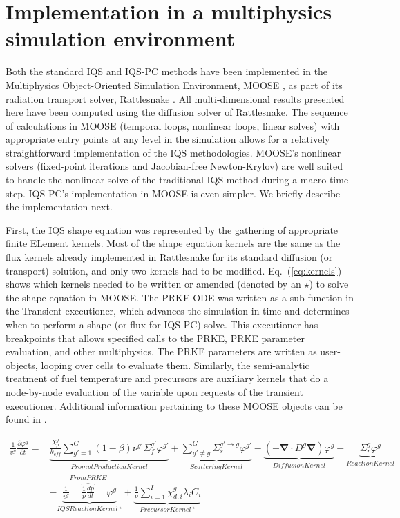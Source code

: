 \documentclass{elsarticle}
\newcommand{\bs}[1]{\mathbf{#1}}
\renewcommand{\div}{\bs{\nabla}\! \cdot \!}
\newcommand{\grad}{\bs{\nabla}}
\newcommand{\eqt}[1]{Eq.~(\ref{#1})}                     %
\newcommand{\keff}{k_\textit{eff}}
\newcommand{\iqspc}{IQS-PC\xspace}
\begin{document}
\section{Implementation in a multiphysics simulation environment}

Both the standard IQS and \iqspc methods have been implemented in the Multiphysics Object-Oriented Simulation Environment, MOOSE \cite{moose}, as part of its radiation transport solver, Rattlesnake \cite{wang2013}. All multi-dimensional results presented here have been computed using the diffusion solver of Rattlesnake. The sequence of 
calculations in MOOSE (temporal loops, nonlinear loops, linear solves) with appropriate entry points at any level in the simulation allows for a relatively straightforward implementation of the IQS methodologies. MOOSE's nonlinear solvers (fixed-point iterations and Jacobian-free Newton-Krylov) are well suited to handle the nonlinear solve of the traditional IQS method during a macro time step. \iqspc's implementation in MOOSE is even simpler. We briefly describe the implementation next. 

First, the IQS shape equation was represented by the gathering of appropriate finite ELement kernels. Most of the shape equation kernels are the same as the flux kernels already implemented in Rattlesnake for its standard diffusion (or transport) solution, and only two kernels had to be modified. \eqt{eq:kernels} shows which kernels needed to be written or amended (denoted by an $\star$) to solve the shape equation in MOOSE. The PRKE ODE was written as a sub-function in the Transient executioner, which advances the simulation in time and determines when to perform a shape (or flux for \iqspc) solve. This executioner has breakpoints that allows specified calls to the PRKE, PRKE parameter evaluation, and other multiphysics. The PRKE parameters are written as user-objects, looping over cells to evaluate them. Similarly, the semi-analytic treatment of fuel temperature and precursors are auxiliary kernels that do a node-by-node evaluation of the variable upon requests of the transient executioner. Additional information pertaining to these MOOSE objects can be found in \cite{PrinceTR2016}.

\begin{align}
\frac{1}{v^g}\frac{\partial\varphi^g}{\partial t}=&\underbrace{\frac{\chi_p^g}{\keff} \sum_{g'=1}^G (1-\beta) \nu^{g'} \Sigma_f^{g'} \varphi^{g'}}_{Prompt Production Kernel} + \underbrace{\sum_{g'\neq g}^G\Sigma_s^{g'\to g} \varphi^{g'}}_{Scattering Kernel} - \underbrace{\left( -\div D^g \grad \right)\varphi^g}_{Diffusion Kernel} - \underbrace{\Sigma_r^g\varphi^g}_{Reaction Kernel} \nonumber \\
& - \underbrace{\frac{1}{v^g} \boxed{\overbrace{\frac{1}{p}\frac{dp}{dt}}^{From PRKE}}\varphi^g}_{IQS Reaction Kernel\ ^\star}+\underbrace{\frac{1}{p}\sum_{i=1}^I\chi_{d,i}^g\lambda_iC_i}_{Precursor Kernel\ ^\star}
\label{eq:kernels}
\end{align}
\end{document}
